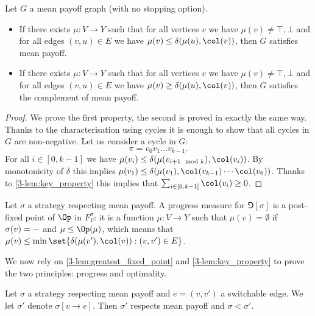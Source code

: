 \begin{lemma}
\label{3-lem:key_property}
Let $G$ a mean payoff graph (with no stopping option).
\begin{itemize}
	\item If there exists $\mu : V \to Y$ such that for all vertices $v$ we have $\mu(v) \neq \top,\bot$
	and for all edges $(v,u) \in E$ we have $\mu(v) \le \delta(\mu(u),\col(v))$,
	then $G$ satisfies mean payoff.
	\item If there exists $\mu : V \to Y$ such that for all vertices $v$ we have $\mu(v) \neq \top,\bot$
	and for all edges $(v,u) \in E$ we have $\mu(v) \ge \delta(\mu(u),\col(v))$,
	then $G$ satisfies the complement of mean payoff.
\end{itemize}
\end{lemma}
\begin{proof}
We prove the first property, the second is proved in exactly the same way.
Thanks to the characterisation using cycles it is enough to show that all cycles in $G$ are non-negative.
Let us consider a cycle in $G$:
\[
\pi = v_0 v_1 \dots v_{k-1}.
\]
For all $i \in [0,k-1]$ we have $\mu(v_i) \le \delta(\mu(v_{i+1 \mod k}),\col(v_i))$.
By monotonicity of $\delta$ this implies $\mu(v_1) \le \delta(\mu(v_1),\col(v_{k-1}) \cdots \col(v_0))$.
Thanks to \cref{3-lem:key_property} this implies that $\sum_{i \in [0,k-1]} \col(v_i) \ge 0$.
\end{proof}

Let $\sigma$ a strategy respecting mean payoff. 
A progress measure for $\Game[\sigma]$ is a post-fixed point of $\Op$ in $F^\sigma_V$:
it is a function $\mu : V \to Y$ such that $\mu(v) = \emptyset$ if $\sigma(v) = \mathtt{-}$ and $\mu \le \Op(\mu)$,
which means that $\mu(v) \le \min \set{ \delta(\mu(v'),\col(v)) : (v,v') \in E}$.

We now rely on \cref{3-lem:greatest_fixed_point} and \cref{3-lem:key_property} to prove the two principles: progress and optimality.

\begin{lemma}[Progress]
Let $\sigma$ a strategy respecting mean payoff and $e = (v,v')$ a switchable edge.
We let $\sigma'$ denote $\sigma[v \to e]$.
Then $\sigma'$ respects mean payoff and $\sigma < \sigma'$.
\end{lemma}

